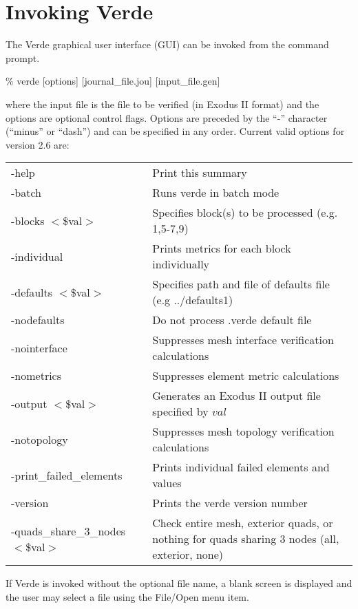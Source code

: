 \documentclass[10pt]{report}
\begin{document}
\section{Invoking Verde}
\label{sec:invoking}

The Verde graphical user interface (GUI) can be invoked from the 
command prompt.


\begin{center}
\% verde [options] [journal\_file.jou] [input\_file.gen]
\end{center}


where the input file is the file to be verified (in Exodus II format) and the 
options are optional control flags.  Options are preceded by the ``-'' 
character (``minus'' or ``dash'') and can be specified in any order. 
Current valid options for version 2.6 are:
\begin{center}
\begin{tabular}{lp{4in}}
-help & Print this summary                                                   \\
-batch & Runs verde in batch mode                                            \\
-blocks $<$\$val$>$ & Specifies block(s) to be processed (e.g. 1,5-7,9)      \\
-individual & Prints metrics for each block individually                     \\
-defaults $<$\$val$>$ & Specifies path and file of defaults file (e.g ../defaults1) \\
-nodefaults & Do not process .verde default file                             \\
-nointerface & Suppresses mesh interface verification calculations           \\
-nometrics & Suppresses element metric calculations                          \\
-output $<$\$val$>$ & Generates an Exodus II output file specified by $val$  \\
-notopology & Suppresses mesh topology verification calculations             \\
-print\_failed\_elements & Prints individual failed elements and values      \\
-version & Prints the verde version number                                   \\
-quads\_share\_3\_nodes $<$\$val$>$ & Check entire mesh, exterior quads, 
or nothing for quads sharing 3 nodes (all, exterior, none)                   \\
\end{tabular}
\end{center}
If Verde is invoked without the optional file name, a blank screen is displayed and 
the user may select a file using the File/Open menu item.
\end{document}
